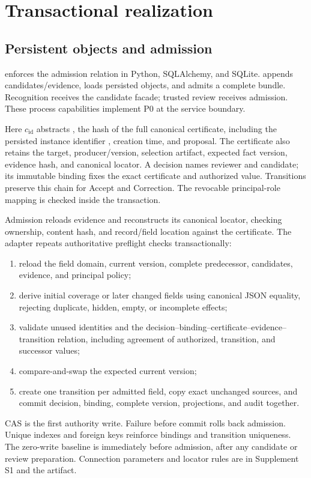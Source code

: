 \section{Transactional realization}
\label{sec:realization}

\subsection{Persistent objects and admission}

\system{} enforces the admission relation in Python, SQLAlchemy, and SQLite.  appends candidates/evidence,  loads persisted objects, and  admits a complete bundle. Recognition receives the candidate facade; trusted review receives admission. These process capabilities implement P0 at the service boundary.

Here $c_{\mathrm{id}}$ abstracts , the hash of the full canonical certificate, including the persisted instance identifier , creation time, and proposal. The certificate also retains the target, producer/version, selection artifact, expected fact version, evidence hash, and canonical locator. A decision names reviewer and candidate; its immutable binding fixes the exact certificate and authorized value. Transitions preserve this chain for Accept and Correction. The revocable principal-role mapping is checked inside the transaction.

Admission reloads evidence and reconstructs its canonical locator, checking ownership, content hash, and record/field location against the certificate. The adapter repeats authoritative preflight checks transactionally:
\begin{enumerate}[leftmargin=*]
\item reload the field domain, current version, complete predecessor, candidates, evidence, and principal policy;
\item derive initial coverage or later changed fields using canonical JSON equality, rejecting duplicate, hidden, empty, or incomplete effects;
\item validate unused identities and the decision--binding--certificate--evidence--transition relation, including agreement of authorized, transition, and successor values;
\item compare-and-swap the expected current version;
\item create one transition per admitted field, copy exact unchanged sources, and commit decision, binding, complete version, projections, and audit together.
\end{enumerate}
CAS is the first authority write. Failure before commit rolls back admission. Unique indexes and foreign keys reinforce bindings and transition uniqueness. The zero-write baseline is immediately before admission, after any candidate or review preparation. Connection parameters and locator rules are in Supplement S1 and the artifact.

